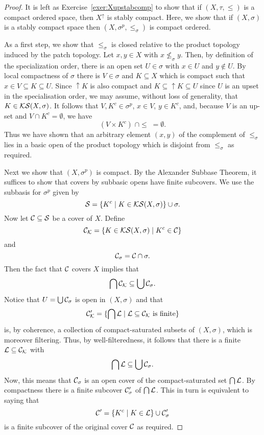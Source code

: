  
 \begin{proof}
 It is left as Exercise~\ref{exer:Xupstabcomp} to show that if $(X,\tau,\leq)$ is a compact ordered space, then $X^\uparrow$ is stably compact. Here, we show that if $(X,\sigma)$ is a stably compact space then $(X,\sigma^p,\leq_\sigma)$ is compact ordered.
 
 As a first step, we show that $\leq_\sigma$ is closed relative to the product topology induced by the patch topology. Let $x,y\in X$ with $x\nleq_\sigma y$. Then, by definition of the specialization order, there is an open set $U\in\sigma$ with $x\in U$ and $y\not\in U$. By local compactness of $\sigma$ there is $V\in\sigma$ and $K\subseteq X$ which is compact such that $x\in V\subseteq K\subseteq U$. Since ${\uparrow}K$ is also compact and $K\subseteq {\uparrow}K\subseteq U$ since $U$ is an upset in the specialisation order, we may assume, without loss of generality, that $K\in\mathcal{KS}(X,\sigma)$. It follows that $V, K^c\in\sigma^p$, $x\in V$, $y\in K^c$, and, because $V$ is an up-set and $V\cap K^c=\emptyset$, we have
 \[
 (V\times K^c)\;\cap \leq \; =\emptyset.
 \]
 Thus we have shown that an arbitrary element $(x,y)$ of the complement of $\leq_\sigma$ lies in a basic open of the product topology which is disjoint from $\leq_\sigma$ as required.
 
 Next we show that $(X,\sigma^p)$ is compact. By the Alexander Subbase Theorem, it suffices to show that covers by subbasic opens have finite subcovers. We use the subbasis for $\sigma^p$ given by
 \[
 \mathcal{S}=\{K^c\mid K\in\mathcal{KS} (X,\sigma)\}\cup\sigma.
 \]
 Now let $\mathcal{C}\subseteq\mathcal{S}$ be a cover of $X$. Define
 \[
 \mathcal{C}_{\mathcal{K}}=\{K\in\mathcal{KS} (X,\sigma)\mid K^c\in\mathcal{C}\}
 \]
 and
 \[
 \mathcal{C}_\sigma=\mathcal{C}\cap\sigma.
 \]
 Then the fact that $\mathcal{C}$ covers $X$ implies that
 \[
 \bigcap\mathcal{C}_{\mathcal{K}}\subseteq\bigcup\mathcal{C}_\sigma.
 \]
 Notice that $U=\bigcup\mathcal{C}_\sigma$ is open in $(X,\sigma)$ and that 
 \[
 \mathcal{C}'_{\mathcal{K}}=\{\bigcap \mathcal{L}\mid \mathcal{L}\subseteq \mathcal{C}_{\mathcal{K}} \text{ is finite} \}
 \]
 is, by coherence, a collection of compact-saturated subsets of $(X,\sigma)$, which is moreover filtering. Thus, by well-filteredness, it follows that there is a finite $ \mathcal{L}\subseteq \mathcal{C}_{\mathcal{K}}$ with
 \[
 \bigcap\mathcal{L}\subseteq\bigcup\mathcal{C}_\sigma.
 \]
 Now, this means that $\mathcal{C}_\sigma$ is an open cover of the compact-saturated set $\bigcap\mathcal{L}$. By compactness there is a finite subcover $\mathcal{C}'_\sigma$ of $\bigcap\mathcal{L}$. This in turn is equivalent to saying that
 \[
 \mathcal{C}'=\{K^c\mid K\in \mathcal{L}\}\cup\mathcal{C}'_\sigma
 \]
 is a finite subcover of the original cover $\mathcal{C}$ as required.
 

\end{proof}

